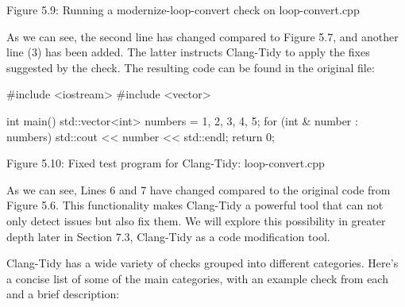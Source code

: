 
\begin{center}
Figure 5.9: Running a modernize-loop-convert check on loop-convert.cpp
\end{center}

As we can see, the second line has changed compared to Figure 5.7, and another line (3) has been added. The latter instructs Clang-Tidy to apply the fixes suggested by the check. The resulting code can be found in the original file:

\begin{cpp}
#include <iostream>
#include <vector>

int main() {
  std::vector<int> numbers = {1, 2, 3, 4, 5};
  for (int & number : numbers) {
    std::cout << number << std::endl;
  }
  return 0;
}
\end{cpp}

\begin{center}
Figure 5.10: Fixed test program for Clang-Tidy: loop-convert.cpp
\end{center}



As we can see, Lines 6 and 7 have changed compared to the original code from Figure 5.6. This functionality makes Clang-Tidy a powerful tool that can not only detect issues but also fix them. We will explore this possibility in greater depth later in Section 7.3, Clang-Tidy as a code modification tool.


Clang-Tidy has a wide variety of checks grouped into different categories. Here's a concise list of some of the main categories, with an example check from each and a brief description:


